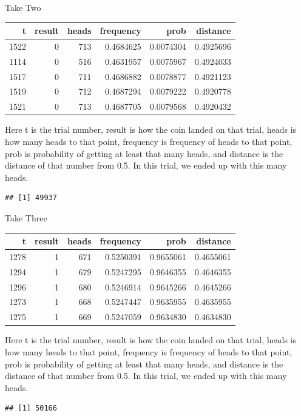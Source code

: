 \documentclass[
  ignorenonframetext,
]{beamer}
\renewcommand{\,}{\text{, }}
\begin{document}
\begin{frame}[fragile]{Take Two}
\protect\hypertarget{take-two}{}

\begin{longtable}[]{@{}rrrrrr@{}}
\toprule
t & result & heads & frequency & prob & distance\tabularnewline
\midrule
\endhead
1522 & 0 & 713 & 0.4684625 & 0.0074304 & 0.4925696\tabularnewline
1114 & 0 & 516 & 0.4631957 & 0.0075967 & 0.4924033\tabularnewline
1517 & 0 & 711 & 0.4686882 & 0.0078877 & 0.4921123\tabularnewline
1519 & 0 & 712 & 0.4687294 & 0.0079222 & 0.4920778\tabularnewline
1521 & 0 & 713 & 0.4687705 & 0.0079568 & 0.4920432\tabularnewline
\bottomrule
\end{longtable}

Here t is the trial number, result is how the coin landed on that trial,
heads is how many heads to that point, frequency is frequency of heads
to that point, prob is probability of getting at least that many heads,
and distance is the distance of that number from 0.5. In this trial, we
ended up with this many heads.

\begin{verbatim}
## [1] 49937
\end{verbatim}

\end{frame}

\begin{frame}[fragile]{Take Three}
\protect\hypertarget{take-three}{}

\begin{longtable}[]{@{}rrrrrr@{}}
\toprule
t & result & heads & frequency & prob & distance\tabularnewline
\midrule
\endhead
1278 & 1 & 671 & 0.5250391 & 0.9655061 & 0.4655061\tabularnewline
1294 & 1 & 679 & 0.5247295 & 0.9646355 & 0.4646355\tabularnewline
1296 & 1 & 680 & 0.5246914 & 0.9645266 & 0.4645266\tabularnewline
1273 & 1 & 668 & 0.5247447 & 0.9635955 & 0.4635955\tabularnewline
1275 & 1 & 669 & 0.5247059 & 0.9634830 & 0.4634830\tabularnewline
\bottomrule
\end{longtable}

Here t is the trial number, result is how the coin landed on that trial,
heads is how many heads to that point, frequency is frequency of heads
to that point, prob is probability of getting at least that many heads,
and distance is the distance of that number from 0.5. In this trial, we
ended up with this many heads.

\begin{verbatim}
## [1] 50166
\end{verbatim}

\end{frame}
\end{document}
